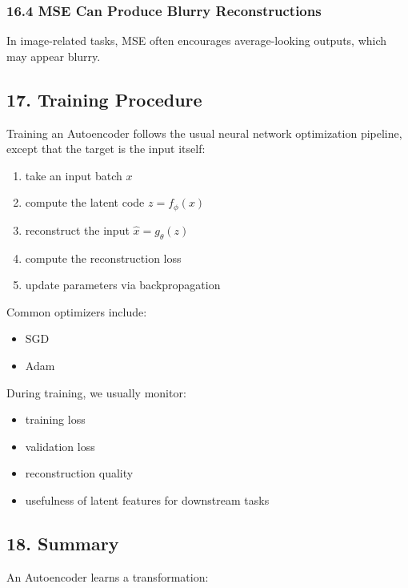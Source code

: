 \documentclass[
  italian,
  11pt,
]{article}
\begin{document}
\subsubsection{16.4 MSE Can Produce Blurry
Reconstructions}\label{mse-can-produce-blurry-reconstructions}

In image-related tasks, MSE often encourages average-looking outputs,
which may appear blurry.

\subsection{17. Training Procedure}\label{training-procedure}

Training an Autoencoder follows the usual neural network optimization
pipeline, except that the target is the input itself:

\begin{enumerate}
\def\labelenumi{\arabic{enumi}.}
\item
  take an input batch \(x\)
\item
  compute the latent code \(z = f_\phi(x)\)
\item
  reconstruct the input \(\hat{x} = g_\theta(z)\)
\item
  compute the reconstruction loss
\item
  update parameters via backpropagation
\end{enumerate}

Common optimizers include:

\begin{itemize}
\item
  SGD
\item
  Adam
\end{itemize}

During training, we usually monitor:

\begin{itemize}
\item
  training loss
\item
  validation loss
\item
  reconstruction quality
\item
  usefulness of latent features for downstream tasks
\end{itemize}

\subsection{18. Summary}\label{summary}

An Autoencoder learns a transformation:
\end{document}
